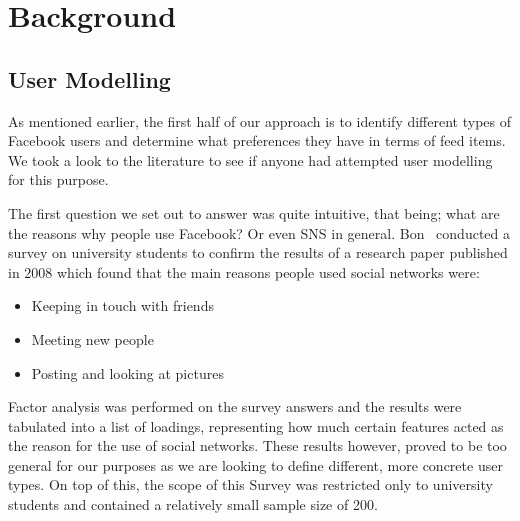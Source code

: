 \chapter{Background}\label{ch:background}


\section{User Modelling}

As mentioned earlier, the first half of our approach is to identify different types of Facebook users and determine what preferences they have in terms of feed items. We took a look to the literature to see if anyone had attempted user modelling for this purpose.

The first question we set out to answer was quite intuitive, that being; what are the reasons why people use Facebook? Or even SNS in general. Bon~\cite{bonds2010myspace} conducted a survey on university students to confirm the results of a research paper published in 2008 which found that the main reasons people used social networks were:

\begin{itemize}
\item Keeping in touch with friends
\item Meeting new people
\item Posting and looking at pictures
\end{itemize}

Factor analysis was performed on the survey answers and the results were tabulated into a list of loadings, representing how much certain features acted as the reason for the use of social networks. These results however, proved to be too general for our purposes as we are looking to define different, more concrete user types. On top of this, the scope of this Survey was restricted only to university students and contained a relatively small sample size of 200.

